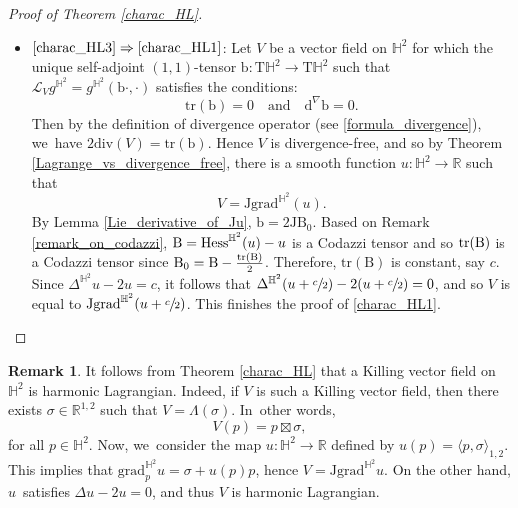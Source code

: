 \documentclass[11pt]{article}
\makeatletter
\DeclareRobustCommand{\mathbbm}[1]{\csname jepbb@#1\endcsname}
\theoremstyle{plain}
\theoremstyle{definition}
\newtheorem{remark}[cor]{Remark}
\newcommand{\bb}{\mathrm{b}}
\newcommand{\minko}{\mathbb{R}^{1,2}}
\newcommand{\grad}{\mathrm{grad}^{\mathbb{H}^2}}
\newcommand{\hess}{\mathrm{Hess}^{\mathbb{H}^2}}
\newcommand{\J}{\mathrm{J}}
\newcommand{\B}{\mathrm{B}}
\newcommand{\inner}[1] {\langle #1 \rangle}
\makeatother
\begin{document}
\begin{proof}[Proof of Theorem \ref{charac_HL}]
\begin{itemize}
\item
$\eqref{charac_HL3}\Rightarrow\eqref{charac_HL1}$: Let \(V \) be a vector field on \(\mathbb{H}^2\) for which the unique self-adjoint \((1,1)\)-tensor \(\bb: \mathrm{T}\mathbb{H}^2 \to \mathrm{T}\mathbb{H}^2\) such that \(\mathcal{L}_V g^{\mathbb{H}^2} = g^{\mathbb{H}^2}(\bb \cdot, \cdot)\) satisfies the conditions:
\[
\mathrm{tr}(\bb) = 0 \quad \text{and} \quad \mathrm{d}^{\nabla} \bb = 0.
\]
Then by the definition of divergence operator (see \eqref{formula_divergence}), we~have $2\mathrm{div}(V)=\mathrm{tr}(\mathrm{b})$. Hence \(V \) is divergence-free, and so by Theorem \ref{Lagrange_vs_divergence_free}, there is a smooth function \hbox{\(u:\mathbb{H}^2 \to \mathbb{R} \)} such that
\[ V = \J \grad(u). \]
By Lemma \ref{Lie_derivative_of_Ju}, \(\bb = 2 \J \B_0\). Based on Remark \ref{remark_on_codazzi}, \(\B = \hess(u) - u \mathbbm{1}\) is a Codazzi tensor and so \(\mathrm{tr}(\B)\mathbbm{1}\) is a Codazzi tensor since \(\B_0 = \B - \frac{\mathrm{tr}(\B)}{2} \mathbbm{1}\). Therefore, \(\mathrm{tr}(\B)\) is constant, say \(c \). Since \(\Delta^{\mathbb{H}^2} u - 2u = c\), it follows that \(\Delta^{\mathbb{H}^2}(u + \sfrac{c}{2}) - 2(u + \sfrac{c}{2}) = 0\), and so \(V \) is equal to \(\J \grad(u + \sfrac{c}{2})\). This finishes the proof of \eqref{charac_HL1}.\qedhere
\end{itemize}
\end{proof}

\begin{remark}\label{Killing_are_harmonic}
It follows from Theorem \ref{charac_HL} that a Killing vector field on $\mathbb{H}^2$ is harmonic Lagrangian. Indeed, if $V$ is such a Killing vector field, then there exists $\sigma\in\minko$ such that $V=\Lambda(\sigma)$. In~other words,
\[
V(p)=p\boxtimes\sigma,
\]
for all $p\in\mathbb{H}^2$. Now, we~consider the map $u:\mathbb{H}^2\to\mathbb{R}$ defined by $u(p)=\inner{p,\sigma}_{1,2}$. This implies that $\grad_p u=\sigma+u(p)p$, hence $V=\J\grad u$. On the other hand, $u$~satisfies $\Delta u-2u=0$, and thus $V$ is harmonic Lagrangian.
\end{remark}
\end{document}
